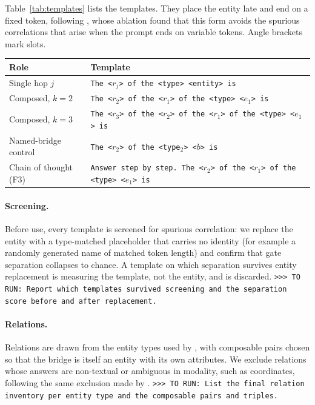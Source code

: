 \documentclass{article}
\newcommand{\TORUN}[1]{{\color{blue}\texttt{>{}>{}> TO RUN: #1}}}
\begin{document}
Table~\ref{tab:templates} lists the templates. They place the entity late and end on a fixed token, following \citet{tamoyan2025factual}, whose
ablation found that this form avoids the spurious correlations that arise when the prompt ends on
variable tokens. Angle brackets mark slots.

\begin{center}
\small
{}
\label{tab:templates}
\vspace{1pt}
\begin{tabular}{@{}lp{9.4cm}@{}}
\toprule
\textbf{Role} & \textbf{Template}\\
\midrule
Single hop $j$ & \texttt{The <$r_j$> of the <type> <entity> is}\\
Composed, $k{=}2$ & \texttt{The <$r_2$> of the <$r_1$> of the <type> <$e_1$> is}\\
Composed, $k{=}3$ & \texttt{The <$r_3$> of the <$r_2$> of the <$r_1$> of the <type> <$e_1$> is}\\
Named-bridge control & \texttt{The <$r_2$> of the <type$_2$> <$b$> is}\\
Chain of thought (F3) & \texttt{Answer step by step. The <$r_2$> of the <$r_1$> of the <type>
<$e_1$> is}\\
\bottomrule
\end{tabular}
\vspace{-1.15em}
\end{center}

\paragraph{Screening.} Before use, every template is screened for spurious correlation: we replace
the entity with a type-matched placeholder that carries no identity (for example a randomly generated
name of matched token length) and confirm that gate separation collapses to chance. A template on
which separation survives entity replacement is measuring the template, not the entity, and is
discarded. \TORUN{Report which templates survived screening and the separation score before and after
replacement.}

\paragraph{Relations.} Relations are drawn from the entity types used by \citet{ferrando2025entity},
with composable pairs chosen so that the bridge is itself an entity with its own attributes. We
exclude relations whose answers are non-textual or ambiguous in modality, such as coordinates,
following the same exclusion made by \citet{tamoyan2025factual}. \TORUN{List the final relation
inventory per entity type and the composable pairs and triples.}
\end{document}
